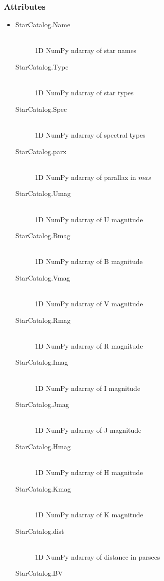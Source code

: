 \documentclass[cleanfoot]{asme2ej}
\begin{document}
\subsubsection*{Attributes}
\begin{itemize}
    \item 
    \begin{description}
        \item[StarCatalog.Name] \hfill \\
        1D NumPy ndarray of star names
        \item[StarCatalog.Type] \hfill \\
        1D NumPy ndarray of star types
        \item[StarCatalog.Spec] \hfill \\
        1D NumPy ndarray of spectral types
        \item[StarCatalog.parx] \hfill \\
        1D NumPy ndarray of parallax in $ mas $
        \item[StarCatalog.Umag] \hfill \\
        1D NumPy ndarray of U magnitude
        \item[StarCatalog.Bmag] \hfill \\
        1D NumPy ndarray of B magnitude
        \item[StarCatalog.Vmag] \hfill \\
        1D NumPy ndarray of V magnitude
        \item[StarCatalog.Rmag] \hfill \\
        1D NumPy ndarray of R magnitude
        \item[StarCatalog.Imag] \hfill \\
        1D NumPy ndarray of I magnitude
        \item[StarCatalog.Jmag] \hfill \\
        1D NumPy ndarray of J magnitude
        \item[StarCatalog.Hmag] \hfill \\
        1D NumPy ndarray of H magnitude
        \item[StarCatalog.Kmag] \hfill \\
        1D NumPy ndarray of K magnitude
        \item[StarCatalog.dist] \hfill \\
        1D NumPy ndarray of distance in parsecs
        \item[StarCatalog.BV] \hfill \\

\end{description}
\end{itemize}
\end{document}
